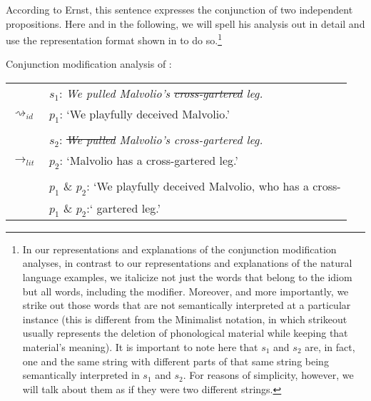 \documentclass[output=paper]{langsci/langscibook}
\begin{document}
\noindent According to Ernst, this sentence expresses the conjunction of two independent propositions. Here and in the following, we will spell his analysis out in detail and use the representation format shown in  to do so.\footnote{In our representations and explanations of the conjunction modification analyses, in contrast to our representations and explanations of the natural language examples, we italicize not just the words that belong to the idiom but all words, including the modifier. Moreover, and more importantly, we strike out those words that are not semantically interpreted at a particular instance (this is different from the Minimalist notation, in which strikeout usually represents the deletion of phonological material while keeping that material's meaning). It is important to note here that $s_{1}$ and $s_{2}$ are, in fact, one and the same string with different parts of that same string being semantically interpreted in $s_{1}$ and $s_{2}$. For reasons of simplicity, however, we will talk about them as if they were two different strings.\label{strings}}

\ea \label{analysis cross-gartered leg -- simple} 
Conjunction modification analysis of : \\
\vspace{5pt}
\begin{tabular}{ll}
								& 	$s_{1}$: \hspace{4pt} \textit{We pulled Malvolio's \sout{cross-gartered} leg.} \\
$\rightsquigarrow_{id}$				&	$p_{1}$: \hspace{1pt} `We playfully deceived Malvolio.' \\
\vspace{-5pt} \\
								& 	$s_{2}$: \hspace{4pt} \textit{\sout{We pulled} Malvolio's cross-gartered leg.} \\
$\rightarrow_{lit}$					&	$p_{2}$: \hspace{1pt} `Malvolio has a cross-gartered leg.' \\
\vspace{-5pt} \\
								&	$p_{1}$ \& $p_{2}$: `We playfully deceived Malvolio, who has a cross- \\
								&	{\white $p_{1}$ \& $p_{2}$:`} gartered leg.'
\end{tabular}
\z
\end{document}
